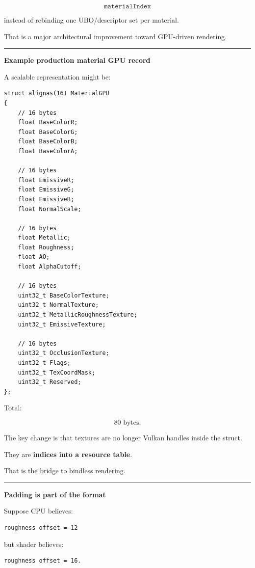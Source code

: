 \[
\texttt{materialIndex}
\]

instead of rebinding one UBO/descriptor set per material.

That is a major architectural improvement toward GPU-driven rendering.

\begin{center}\rule{0.5\linewidth}{0.5pt}\end{center}

\textbf{Example production material GPU record}

A scalable representation might be:

\begin{verbatim}
struct alignas(16) MaterialGPU
{
    // 16 bytes
    float BaseColorR;
    float BaseColorG;
    float BaseColorB;
    float BaseColorA;

    // 16 bytes
    float EmissiveR;
    float EmissiveG;
    float EmissiveB;
    float NormalScale;

    // 16 bytes
    float Metallic;
    float Roughness;
    float AO;
    float AlphaCutoff;

    // 16 bytes
    uint32_t BaseColorTexture;
    uint32_t NormalTexture;
    uint32_t MetallicRoughnessTexture;
    uint32_t EmissiveTexture;

    // 16 bytes
    uint32_t OcclusionTexture;
    uint32_t Flags;
    uint32_t TexCoordMask;
    uint32_t Reserved;
};
\end{verbatim}

Total:

\[
80\text{ bytes}.
\]

The key change is that textures are no longer Vulkan handles inside the struct.

They are \textbf{indices into a resource table}.

That is the bridge to bindless rendering.

\begin{center}\rule{0.5\linewidth}{0.5pt}\end{center}

\textbf{Padding is part of the format}

Suppose CPU believes:

\begin{verbatim}
roughness offset = 12
\end{verbatim}

but shader believes:

\begin{verbatim}
roughness offset = 16.
\end{verbatim}

